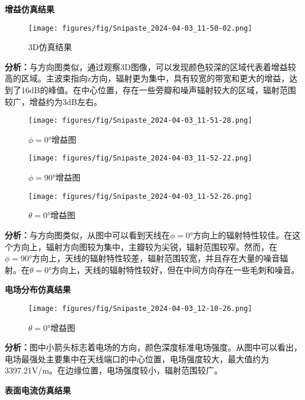 \documentclass[12pt,hyperref,a4paper,UTF8]{ctexart}
\begin{document}
\textbf{增益仿真结果}

\begin{figure}[H]
    \centering
    \texttt{[image: figures/fig/Snipaste\_2024-04-03\_11-50-02.png]}
    \caption{3D仿真结果}
    \label{fig:enter-label}
\end{figure}

\textbf{分析：}与方向图类似，通过观察3D图像，可以发现颜色较深的区域代表着增益较高的区域。主波束指向z方向，辐射更为集中，具有较宽的带宽和更大的增益，达到了16dB的峰值。在中心位置，存在一些旁瓣和噪声辐射较大的区域，辐射范围较广，增益约为3dB左右。


\begin{figure}[H]
    \centering
    \texttt{[image: figures/fig/Snipaste\_2024-04-03\_11-51-28.png]}
    \caption{$\phi=0°$增益图}
    \label{fig:enter-label}
\end{figure}

\begin{figure}[H]
    \centering
    \texttt{[image: figures/fig/Snipaste\_2024-04-03\_11-52-22.png]}
    \caption{$\phi=90°$增益图}
    \label{fig:enter-label}
\end{figure}

\begin{figure}[H]
    \centering
    \texttt{[image: figures/fig/Snipaste\_2024-04-03\_11-52-26.png]}
    \caption{$\theta=0°$增益图}
    \label{fig:enter-label}
\end{figure}


\textbf{分析：}与方向图类似，从图中可以看到天线在$\phi=0°$方向上的辐射特性较佳。在这个方向上，辐射方向图较为集中，主瓣较为尖锐，辐射范围较窄。然而，在$\phi=90°$方向上，天线的辐射特性较差，辐射范围较宽，并且存在大量的噪音辐射。在$\theta=0°$方向上，天线的辐射特性较好，但在中间方向存在一些毛刺和噪音。
\newpage

\textbf{电场分布仿真结果}

\begin{figure}[H]
    \centering
    \texttt{[image: figures/fig/Snipaste\_2024-04-03\_12-10-26.png]}
    \caption{$\theta=0°$增益图}
    \label{fig:enter-label}
\end{figure}
\textbf{分析：}图中小箭头标志着电场的方向，颜色深度标准电场强度。从图中可以看出，电场最强处主要集中在天线端口的中心位置，电场强度较大，最大值约为3397.21V/m。在边缘位置，电场强度较小，辐射范围较广。


\textbf{表面电流仿真结果}
\end{document}
